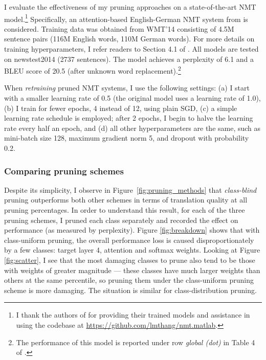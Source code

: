 
I evaluate the effectiveness of my pruning approaches on a state-of-the-art
NMT model.\footnote{I thank the authors of \cite{luong15attn}
for providing their trained models and assistance in using the codebase
at \url{https://github.com/lmthang/nmt.matlab}.} 
Specifically, an attention-based English-German NMT system from
\cite{luong15attn} is considered. 
Training data was obtained from WMT'14 consisting
of 4.5M sentence pairs (116M English words, 110M German words). For
more details on training hyperparameters, I refer readers to Section 4.1 of
\cite{luong15attn}.
All models are tested on newstest2014 (2737 sentences). 
The model achieves a
perplexity of 6.1 and a BLEU score of
20.5 (after unknown word replacement).\footnote{The performance of this model
is reported under row {\it global (dot)} in Table 4 of
\cite{luong15attn}.}

When {\it retraining} pruned NMT systems, I use the following settings: (a) I start
with a smaller learning rate of 0.5 (the original model uses a learning rate of
1.0), (b) I train for fewer epochs, 4 instead of 12, using plain SGD, (c) a simple learning
rate schedule is employed; after 2 epochs, I begin to halve the learning rate
every half an epoch, and (d) all other hyperparameters are the same, such as
mini-batch size 128, maximum gradient norm 5, and dropout with probability 0.2.

\subsubsection{Comparing pruning schemes}
\label{subsubsec:exp_schemes}
Despite its simplicity, I observe in Figure~\ref{fig:pruning_methods} that {\it
class-blind} pruning outperforms both other schemes in terms of translation
quality at all pruning percentages.
In order to understand this result, for each of the three pruning schemes, I pruned each class separately and recorded the effect on performance (as measured by perplexity).
Figure \ref{fig:breakdown} shows that with class-uniform pruning, the overall performance loss is caused disproportionately by a few classes: target layer 4, attention and softmax weights. Looking at Figure \ref{fig:scatter}, I see that the most damaging classes to prune also tend to be those with weights of greater magnitude --- these classes have much larger weights than others at the same percentile, so pruning them under the class-uniform pruning scheme is more damaging. The situation is similar for class-distribution pruning.



